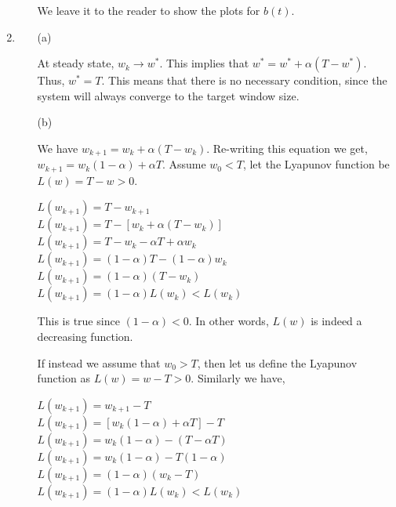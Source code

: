 \documentclass{article}
\begin{document}
\begin{enumerate}
\begin{itemize}
We leave it to the reader to show the plots for $b(t)$.

\end{itemize}

\item

\begin{itemize}
\item[(a)] \smallbreak

\noindent At steady state, $w_k \rightarrow w^*$. This implies
that $w^* = w^* + \alpha(T - w^*)$. Thus, $w^* = T$. This means
that there is no necessary condition, since the system will always
converge to the target window size. \bigbreak


\item[(b)] \smallbreak

\noindent We have $w_{k+1} = w_k + \alpha(T - w_k)$.
Re-writing this equation we get, $w_{k+1} = w_k(1-\alpha) + \alpha T$. 
\noindent 
Assume $w_0 < T$, let the
Lyapunov function be $L(w) = T - w > 0$.

\bigbreak
\noindent $L(w_{k+1}) = T - w_{k+1}$\\
\noindent $L(w_{k+1}) = T - [w_k + \alpha(T - w_k)]$\\
\noindent $L(w_{k+1}) = T - w_k - \alpha T + \alpha w_k$\\
\noindent $L(w_{k+1}) = (1-\alpha)T - (1-\alpha)w_k$\\
\noindent $L(w_{k+1}) = (1-\alpha)(T-w_k)$\\
\noindent $L(w_{k+1}) = (1-\alpha)L(w_k) < L(w_k)$ \bigbreak

\noindent This is true since $(1-\alpha) < 0$. In other words,
$L(w)$ is indeed a decreasing function. \bigbreak

\noindent If instead we assume that $w_0 > T$, then let us define the Lyapunov
function as $L(w) = w - T > 0$. Similarly we have,

\bigbreak
\noindent $L(w_{k+1}) = w_{k+1} - T$\\
\noindent $L(w_{k+1}) = [w_k(1-\alpha) + \alpha T] - T$\\
\noindent $L(w_{k+1}) = w_k(1-\alpha) - (T - \alpha T)$\\
\noindent $L(w_{k+1}) = w_k(1-\alpha) - T(1-\alpha)$\\
\noindent $L(w_{k+1}) = (1-\alpha)(w_k-T)$\\
\noindent $L(w_{k+1}) = (1-\alpha)L(w_k) < L(w_k)$ \bigbreak


\end{itemize}
\end{enumerate}
\end{document}
